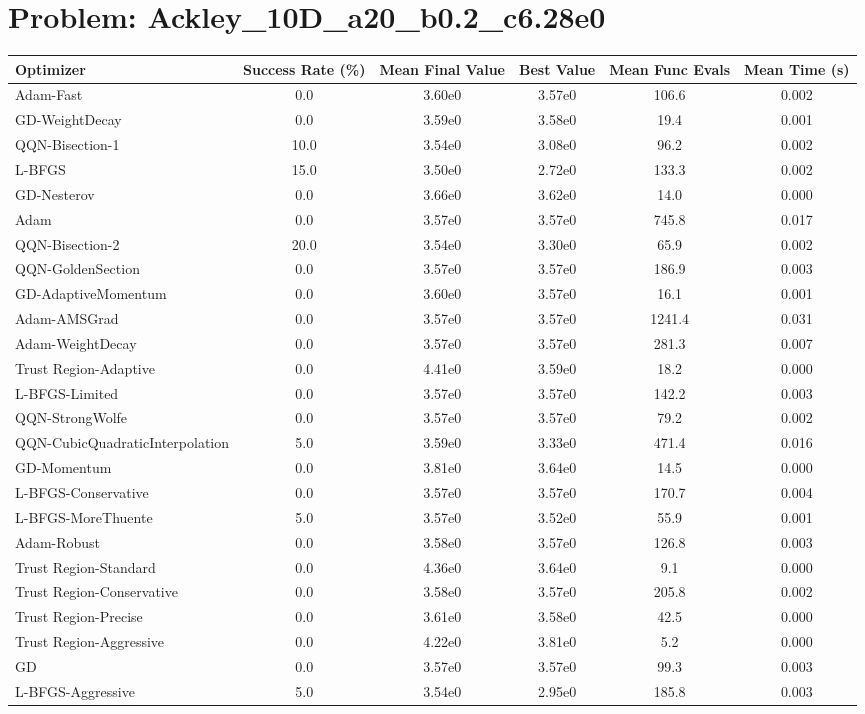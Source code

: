 \documentclass{article}
\begin{document}
\section{Problem: Ackley\_10D\_a20\_b0.2\_c6.28e0}
\begin{longtable}{p{3cm}*{5}{c}}
\toprule
\textbf{Optimizer} & \textbf{Success Rate (\%)} & \textbf{Mean Final Value} & \textbf{Best Value} & \textbf{Mean Func Evals} & \textbf{Mean Time (s)} \\
\midrule
Adam-Fast & 0.0 & 3.60e0 & 3.57e0 & 106.6 & 0.002 \\
GD-WeightDecay & 0.0 & 3.59e0 & 3.58e0 & 19.4 & 0.001 \\
QQN-Bisection-1 & 10.0 & 3.54e0 & 3.08e0 & 96.2 & 0.002 \\
L-BFGS & 15.0 & 3.50e0 & 2.72e0 & 133.3 & 0.002 \\
GD-Nesterov & 0.0 & 3.66e0 & 3.62e0 & 14.0 & 0.000 \\
Adam & 0.0 & 3.57e0 & 3.57e0 & 745.8 & 0.017 \\
QQN-Bisection-2 & 20.0 & 3.54e0 & 3.30e0 & 65.9 & 0.002 \\
QQN-GoldenSection & 0.0 & 3.57e0 & 3.57e0 & 186.9 & 0.003 \\
GD-AdaptiveMomentum & 0.0 & 3.60e0 & 3.57e0 & 16.1 & 0.001 \\
Adam-AMSGrad & 0.0 & 3.57e0 & 3.57e0 & 1241.4 & 0.031 \\
Adam-WeightDecay & 0.0 & 3.57e0 & 3.57e0 & 281.3 & 0.007 \\
Trust Region-Adaptive & 0.0 & 4.41e0 & 3.59e0 & 18.2 & 0.000 \\
L-BFGS-Limited & 0.0 & 3.57e0 & 3.57e0 & 142.2 & 0.003 \\
QQN-StrongWolfe & 0.0 & 3.57e0 & 3.57e0 & 79.2 & 0.002 \\
QQN-CubicQuadraticInterpolation & 5.0 & 3.59e0 & 3.33e0 & 471.4 & 0.016 \\
GD-Momentum & 0.0 & 3.81e0 & 3.64e0 & 14.5 & 0.000 \\
L-BFGS-Conservative & 0.0 & 3.57e0 & 3.57e0 & 170.7 & 0.004 \\
L-BFGS-MoreThuente & 5.0 & 3.57e0 & 3.52e0 & 55.9 & 0.001 \\
Adam-Robust & 0.0 & 3.58e0 & 3.57e0 & 126.8 & 0.003 \\
Trust Region-Standard & 0.0 & 4.36e0 & 3.64e0 & 9.1 & 0.000 \\
Trust Region-Conservative & 0.0 & 3.58e0 & 3.57e0 & 205.8 & 0.002 \\
Trust Region-Precise & 0.0 & 3.61e0 & 3.58e0 & 42.5 & 0.000 \\
Trust Region-Aggressive & 0.0 & 4.22e0 & 3.81e0 & 5.2 & 0.000 \\
GD & 0.0 & 3.57e0 & 3.57e0 & 99.3 & 0.003 \\
L-BFGS-Aggressive & 5.0 & 3.54e0 & 2.95e0 & 185.8 & 0.003 \\
\bottomrule
\end{longtable}
\end{document}
